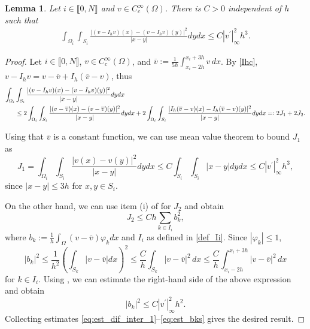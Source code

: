 \documentclass[11 pt]{article}
\newcommand\inter[1]{\llbracket #1\rrbracket}
\newtheorem{lemma}[theorem]{Lemma}
\numberwithin{equation}{section}
\begin{document}
\begin{lemma}\label{lem:stab_dif_interp}
Let $i\in\inter{0,N}$ and $v\in C_c^\infty(\Omega)$. There is $C>0$ independent of $h$ such that
\begin{align}\label{eq:approxim_estimate}
    \int_{\Omega_i}\int_{S_i}\frac{|(v-I_h v)(x)-(v-I_h v)(y)|^2}{|x-y|}dy dx \leq C |v^\prime|^2_{\infty} h^3.
\end{align}
\end{lemma}
%
\begin{proof}
Let $i\in\inter{0,N}$, $v\in C_c^\infty(\Omega)$, and $\overline {v}:=\frac{1}{5h}\int_{x_i-2h}^{x_i+3h}v\,dx$.
By \eqref{Ihc}, $v-I_h v=v-\overline{v}+I_h(\overline v - v)$, thus
%
\begin{align}\notag
    \int_{\Omega_i}&\int_{S_i}\frac{|(v-I_h v)(x)-(v-I_h v)(y)|^2}{|x-y|} dy dx \\
    &\leq 2\int_{\Omega_i}\int_{S_i}\frac{|(v-\overline{v})(x)-(v-\overline{v})(y)|^2}{|x-y|}dy dx + 2 \int_{\Omega_i}\int_{S_i}\frac{|I_h(\overline v-{v})(x)-I_h(\overline v-{v})(y)|^2}{|x-y|}dy dx =:2J_1+2J_2.\label{eq:est_dif_inter_1}
\end{align}
%

Using that $\overline v$ is a constant function, we can use mean value theorem to bound $J_1$ as
%
\begin{equation}\label{eq:est_J1}
    J_1 = \int_{\Omega_i}\int_{S_i}\frac{|v(x)-v(y)|^2}{|x-y|}dy dx \leq C \int_{S_i}\int_{S_i}|x-y|dy dx \leq C{|v^\prime|^2_{\infty}}h^3,
\end{equation}
since $|x-y|\leq 3h$ for $x,y\in S_i$.

On the other hand, we can use item (i) of  for $J_2$ and obtain
%
\begin{equation}\label{eq:est_J2}
    J_2 \leq Ch\sum_{k\in I_i} b_k^2,
\end{equation}
%
where $b_k:=\frac{1}{h}\int_{\Omega}(v-\overline v)\varphi_k dx$ and $I_i$ as defined in \eqref{def_Ii}. Since $|\varphi_k|\leq 1$,
\begin{equation}\label{abk}
    |b_k|^2
    \leq \frac{1}{h^2}\left(\int_{S_k} |v-\overline v|dx\right)^2
    \leq \frac{C}{h}\int_{S_k}|v-\overline{v}|^2\, dx
    \leq \frac{C}{h}\int_{x_i-2h}^{x_i+3h}|v-\overline{v}|^2\, dx
\end{equation}
for $k\in I_i.$ Using , we can estimate the right-hand side of the above expression and obtain
%
\begin{equation}\label{eq:est_bks}
    |b_k|^2\leq C{|v^\prime|^2_{\infty}}h^2.
\end{equation}
%
Collecting estimates \eqref{eq:est_dif_inter_1}--\eqref{eq:est_bks} gives the desired result.
\end{proof}
\end{document}
